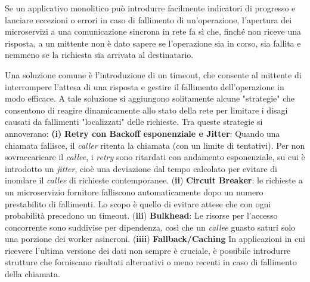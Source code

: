 Se un applicativo monolitico può introdurre facilmente indicatori di progresso e lanciare eccezioni o errori in caso di fallimento di un'operazione, l'apertura dei microservizi a una comunicazione sincrona in rete fa sì che, finché non riceve una risposta, a un mittente non è dato sapere se l'operazione sia in corso, sia fallita e nemmeno se la richiesta sia arrivata al destinatario.

Una soluzione comune è l'introduzione di un timeout, che consente al mittente di interrompere l'attesa di una risposta e gestire il fallimento dell'operazione in modo efficace.
A tale soluzione si aggiungono solitamente alcune "strategie"\cite{Thesis_microservices} che consentono di reagire dinamicamente allo stato della rete per limitare i disagi causati da fallimenti "localizzati" delle richieste.
Tra queste strategie si annoverano: \textbf{(i)} \textbf{Retry con Backoff esponenziale e Jitter}: Quando una chiamata fallisce, il \emph{caller} ritenta la chiamata (con un limite di tentativi).
Per non sovraccaricare il \emph{callee}, i \emph{retry} sono ritardati con andamento esponenziale, su cui è introdotto un \emph{jitter}, cioè una deviazione dal tempo calcolato per evitare di inondare il \emph{callee} di richieste contemporanee. (\textbf{ii}) \textbf{Circuit Breaker}: le richieste a un microservizio fornitore falliscono automaticamente dopo un numero prestabilito di fallimenti. Lo scopo è quello di evitare attese che con ogni probabilità precedono un timeout. (\textbf{iii}) \textbf{Bulkhead}: Le risorse per l'accesso concorrente sono suddivise per dipendenza, così che un \emph{callee} guasto saturi solo una porzione dei worker asincroni. (\textbf{iiii}) \textbf{Fallback/Caching} In applicazioni in cui ricevere l'ultima versione dei dati non sempre è cruciale, è possibile introdurre strutture che forniscano risultati alternativi o meno recenti in caso di fallimento della chiamata.

